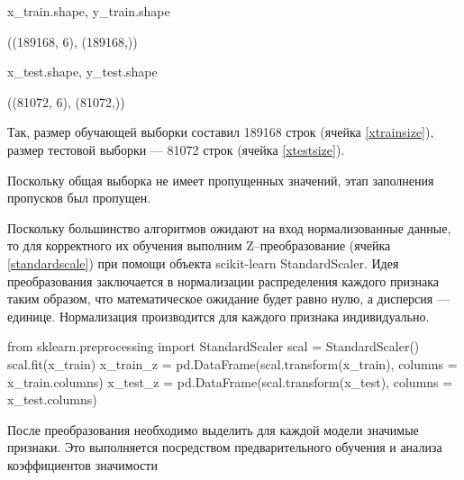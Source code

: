 \begin{pyin}[xtrainsize]
x_train.shape, y_train.shape
\end{pyin}

\begin{pyprint}
((189168, 6), (189168,))
\end{pyprint}
\begin{pyin}[xtestsize]
x_test.shape, y_test.shape
\end{pyin}

\begin{pyprint}
	((81072, 6), (81072,))
\end{pyprint}
Так, размер обучающей выборки составил 189168 строк (ячейка \ref{xtrainsize}), размер тестовой выборки --- 81072 строк (ячейка \ref{xtestsize}).

Поскольку общая выборка не имеет пропущенных значений, этап заполнения пропусков был пропущен.

Поскольку большинство алгоритмов ожидают на вход нормализованные данные, то для корректного их обучения выполним Z--преобразование (ячейка \ref{standardscale}) при помощи объекта scikit-learn StandardScaler. Идея преобразования заключается в нормализации распределения каждого признака таким образом, что математическое ожидание будет равно нулю, а дисперсия --- единице. Нормализация производится для каждого признака индивидуально.
\begin{pyin}[standardscale]
from sklearn.preprocessing import StandardScaler
scal = StandardScaler()
scal.fit(x_train)
x_train_z = pd.DataFrame(scal.transform(x_train), columns = x_train.columns)
x_test_z = pd.DataFrame(scal.transform(x_test), columns = x_test.columns)
\end{pyin}
После преобразования необходимо выделить для каждой модели значимые признаки. Это выполняется посредством предварительного обучения и анализа коэффициентов значимости \cite{hackeling2017mastering}

